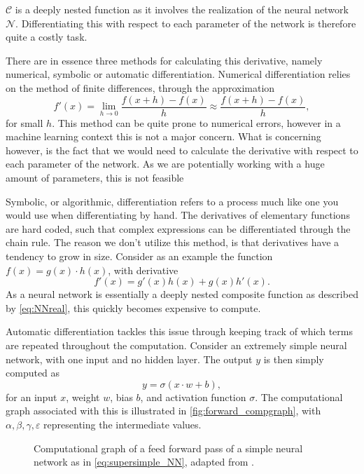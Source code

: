 $\mathcal{C}$ is a deeply nested function as it involves the realization of the neural network $\mathcal{N}$.
Differentiating this with respect to each parameter of the network is therefore quite a costly task.

There are in essence three methods for calculating this derivative, namely numerical, symbolic or automatic differentiation.
Numerical differentiation relies on the method of finite differences, through the approximation
\begin{equation}
    f'(x) = \lim_{h \to 0} \frac{f(x+h) - f(x)}{h} \approx \frac{f(x + h) - f(x)}{h},
\end{equation}
for small $h$.
This method can be quite prone to numerical errors, however in a machine learning context this is not a major concern.
What is concerning however, is the fact that we would need to calculate the derivative with respect to each parameter of the network.
As we are potentially working with a huge amount of parameters, this is not feasible

Symbolic, or algorithmic, differentiation refers to a process much like one you would use when differentiating by hand.
The derivatives of elementary functions are hard coded, such that complex expressions can be differentiated through the chain rule.
The reason we don't utilize this method, is that derivatives have a tendency to grow in size.
Consider as an example the function $f(x) = g(x) \cdot h(x)$,
with derivative
\begin{equation}
    f'(x) = g'(x) h(x) + g(x) h'(x).
\end{equation}
As a neural network is essentially a deeply nested composite function as described by \eqref{eq:NNreal}, this quickly becomes expensive to compute.

Automatic differentiation tackles this issue through keeping track of which terms are repeated throughout the computation.
Consider an extremely simple neural network, with one input and no hidden layer.
The output $y$ is then simply computed as
\begin{equation}\label{eq:supersimple_NN}
    y = \sigma \left( x \cdot w + b \right),
\end{equation}
for an input $x$, weight $w$, bias $b$, and activation function $\sigma$.
The computational graph associated with this is illustrated in \autoref{fig:forward_compgraph}, with $\alpha, \beta, \gamma, \varepsilon$ representing the intermediate values.

\begin{figure}[h]
\centering

\caption{Computational graph of a feed forward pass of a simple neural network as in \eqref{eq:supersimple_NN}, adapted from \cite{autodiff}.}
\label{fig:forward_compgraph}
\end{figure}

